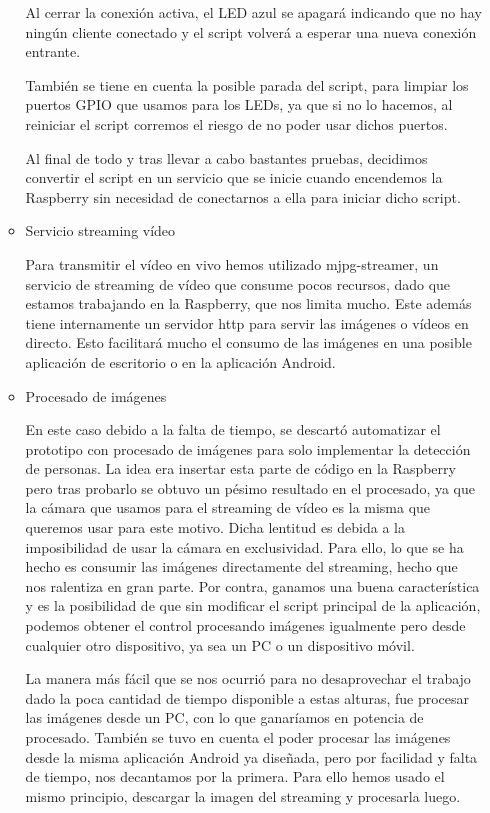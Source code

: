 \documentclass{pclass}
\begin{document}
\begin{itemize}
\begin{itemize}
	Al cerrar la conexión activa, el LED azul se apagará indicando que no hay ningún cliente conectado y el script volverá a esperar una nueva conexión entrante.
	
	También se tiene en cuenta la posible parada del script, para limpiar los puertos GPIO que usamos para los LEDs, ya que si no lo hacemos, al reiniciar el script corremos el riesgo de no poder usar dichos puertos.
	
	Al final de todo y tras llevar a cabo bastantes pruebas, decidimos convertir el script en un servicio que se inicie cuando encendemos la Raspberry sin necesidad de conectarnos a ella para iniciar dicho script.	\cite{servicio}
	

	
	\item Servicio streaming vídeo
	
	Para transmitir el vídeo en vivo hemos utilizado mjpg-streamer, un servicio de streaming de vídeo que consume pocos recursos, dado que estamos trabajando en la Raspberry, que nos limita mucho. Este además tiene internamente un servidor http para servir las imágenes o vídeos en directo. Esto facilitará mucho el consumo de las imágenes en una posible aplicación de escritorio o en la aplicación Android.
	
	
	
	\item Procesado de imágenes
	
		En este caso debido a la falta de tiempo, se descartó automatizar el prototipo con procesado de imágenes para solo implementar la detección de personas. La idea era insertar esta parte de código en la Raspberry pero tras probarlo se obtuvo un pésimo resultado en el procesado, ya que la cámara que usamos para el streaming de vídeo es la misma que queremos usar para este motivo. Dicha lentitud es debida a la imposibilidad de usar la cámara en exclusividad. Para ello, lo que se ha hecho es consumir las imágenes directamente del streaming, hecho que nos ralentiza en gran parte. Por contra, ganamos una buena característica y es la posibilidad de que sin modificar el script principal de la aplicación, podemos obtener el control procesando imágenes igualmente pero desde cualquier otro dispositivo, ya sea un PC o un dispositivo móvil.
		
		La manera más fácil que se nos ocurrió para no desaprovechar el trabajo dado la poca cantidad de tiempo disponible a estas alturas, fue procesar las imágenes desde un PC, con lo que ganaríamos en potencia de procesado. También se tuvo en cuenta el poder procesar las imágenes desde la misma aplicación Android ya diseñada, pero por facilidad y falta de tiempo, nos decantamos por la primera. Para ello hemos usado el mismo principio, descargar la imagen del streaming y procesarla luego. 
		

\end{itemize}
\end{itemize}
\end{document}

